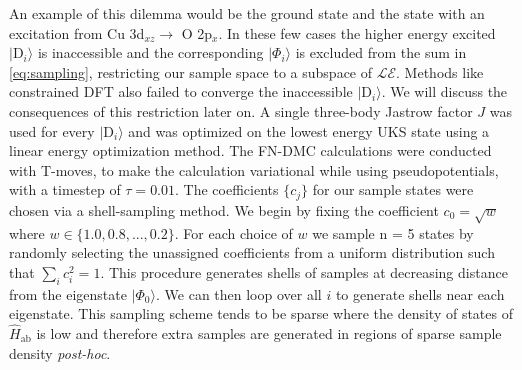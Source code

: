\documentclass{article}
\begin{document}
An example of this dilemma would be the ground state and the state with an excitation from Cu 3d$_{xz} \rightarrow $  O 2p$_x$.
In these few cases the higher energy excited $|\text{D}_i\rangle$ is inaccessible and the corresponding $|\Phi_i\rangle$ is excluded from the sum in \eqref{eq:sampling}, restricting our sample space to a subspace of $\mathcal{LE}$.
Methods like constrained DFT also failed to converge the inaccessible $|\text{D}_i\rangle$.
We will discuss the consequences of this restriction later on.
A single three-body Jastrow factor $J$ was used for every $|\text{D}_i\rangle$ and was optimized on the lowest energy UKS state using a linear energy optimization method.
The FN-DMC calculations were conducted with T-moves, to make the calculation variational while using pseudopotentials, with a timestep of $\tau = 0.01$.
The coefficients $\{c_j\}$ for our sample states were chosen via a shell-sampling method. 
We begin by fixing the coefficient $c_0 = \sqrt{w}$ where $w \in \{1.0, 0.8, ..., 0.2\}$. 
For each choice of $w$ we sample n = 5 states by randomly selecting the unassigned coefficients from a uniform distribution such that $\sum_i c_i^2 = 1$. 
This procedure generates shells of samples at decreasing distance from the eigenstate $|\Phi_0\rangle$. 
We can then loop over all $i$ to generate shells near each eigenstate.
This sampling scheme tends to be sparse where the density of states of $\hat{H}_\text{ab}$ is low and therefore extra samples are generated in regions of sparse sample density \textit{post-hoc}. 
\end{document}
